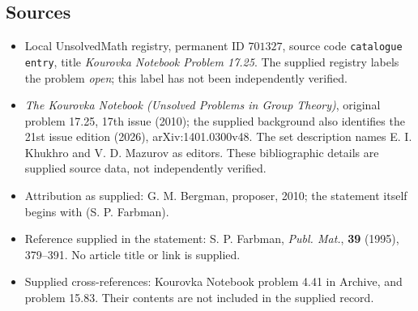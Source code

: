 \documentclass[11pt]{article}
\begin{document}
\subsection{Sources}
\begin{itemize}
\item Local UnsolvedMath registry, permanent ID \(701327\), source code \texttt{catalogue entry}, title \emph{Kourovka Notebook Problem 17.25}. The supplied registry labels the problem \emph{open}; this label has not been independently verified.
\item \emph{The Kourovka Notebook (Unsolved Problems in Group Theory)}, original problem 17.25, 17th issue (2010); the supplied background also identifies the 21st issue edition (2026), arXiv:1401.0300v48. The set description names E. I. Khukhro and V. D. Mazurov as editors. These bibliographic details are supplied source data, not independently verified.
\item Attribution as supplied: G. M. Bergman, proposer, 2010; the statement itself begins with \textnormal{(S. P. Farbman)}.
\item Reference supplied in the statement: S. P. Farbman, \emph{Publ. Mat.}, \textbf{39} (1995), 379--391. No article title or link is supplied.
\item Supplied cross-references: Kourovka Notebook problem 4.41 in Archive, and problem 15.83. Their contents are not included in the supplied record.
\end{itemize}
\end{document}
